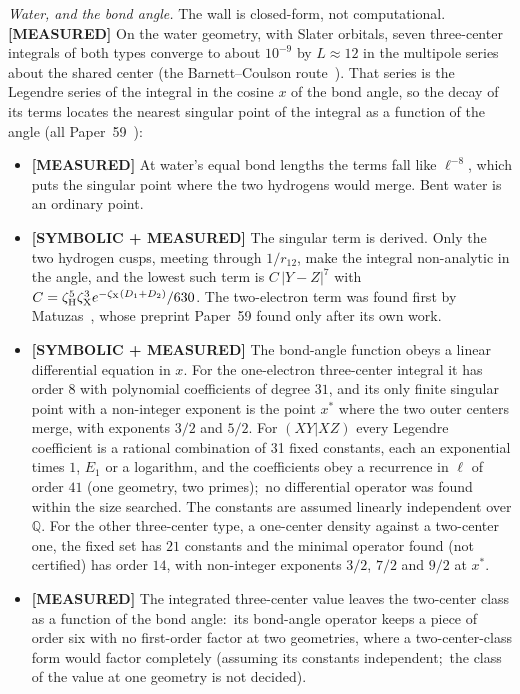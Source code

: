 \documentclass[aps,pra,twocolumn,superscriptaddress,longbibliography]{revtex4-2}
\begin{document}
\emph{Water, and the bond angle.}  The wall is closed-form, not
computational.  \textbf{[MEASURED]} On the water geometry, with Slater
orbitals, seven three-center integrals of both types converge to about
$10^{-9}$ by $L\approx12$ in the multipole series about the shared
center (the Barnett--Coulson route~\cite{barnett_coulson1951}).  That
series is the Legendre series of the integral in the cosine $x$ of the
bond angle, so the decay of its terms locates the nearest singular point
of the integral as a function of the angle (all
Paper~59~\cite{loutey_paper59}):

\begin{itemize}
\item \textbf{[MEASURED]} At water's equal bond lengths the terms fall
like $\ell^{-8}$, which puts the singular point where the two hydrogens
would merge.  Bent water is an ordinary point.
\item \textbf{[SYMBOLIC + MEASURED]} The singular term is derived.  Only
the two hydrogen cusps, meeting through $1/r_{12}$, make the integral
non-analytic in the angle, and the lowest such term is $C\,|Y-Z|^{7}$
with $C=\zeta_{\rm H}^{5}\zeta_{\rm X}^{3}e^{-\zeta_{\rm
X}(D_1+D_2)}/630$.  The two-electron term was found first by
Matuzas~\cite{matuzas2026sc}, whose preprint Paper~59 found only after
its own work.
\item \textbf{[SYMBOLIC + MEASURED]} The bond-angle function obeys a
linear differential equation in $x$.  For the one-electron three-center
integral it has order $8$ with polynomial coefficients of degree $31$,
and its only finite singular point with a non-integer exponent is the
point $x^{*}$ where the two outer centers merge, with exponents $3/2$ and
$5/2$.  For $(XY|XZ)$ every Legendre coefficient is a rational
combination of 31 fixed constants, each an exponential times $1$, $E_1$
or a logarithm, and the coefficients obey a recurrence in $\ell$ of order
$41$ (one geometry, two primes);\ no differential operator was found
within the size searched.  The constants are assumed linearly
independent over $\mathbb{Q}$.  For
the other three-center type, a one-center density against a two-center
one, the fixed set has $21$ constants and the minimal operator found (not
certified) has order $14$, with non-integer exponents $3/2$, $7/2$ and
$9/2$ at $x^{*}$.
\item \textbf{[MEASURED]} The integrated three-center value leaves the
two-center class as a function of the bond angle:\ its bond-angle
operator keeps a piece of order six with no first-order factor at two
geometries, where a two-center-class form would factor completely
(assuming its constants independent;\ the class of the value at one
geometry is not decided).
\end{itemize}
\end{document}
